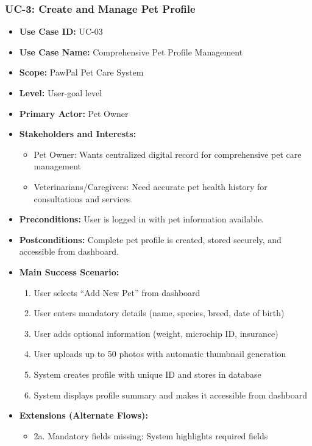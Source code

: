 \subsubsection*{UC-3: Create and Manage Pet Profile}
\begin{itemize}
    \item \textbf{Use Case ID:} UC-03
    \item \textbf{Use Case Name:} Comprehensive Pet Profile Management
    \item \textbf{Scope:} PawPal Pet Care System
    \item \textbf{Level:} User-goal level
    \item \textbf{Primary Actor:} Pet Owner
    \item \textbf{Stakeholders and Interests:}
    \begin{itemize}
        \item Pet Owner: Wants centralized digital record for comprehensive pet care management
        \item Veterinarians/Caregivers: Need accurate pet health history for consultations and services
    \end{itemize}
    \item \textbf{Preconditions:} User is logged in with pet information available.
    \item \textbf{Postconditions:} Complete pet profile is created, stored securely, and accessible from dashboard.
    \item \textbf{Main Success Scenario:}
    \begin{enumerate}
        \item User selects ``Add New Pet'' from dashboard
        \item User enters mandatory details (name, species, breed, date of birth)
        \item User adds optional information (weight, microchip ID, insurance)
        \item User uploads up to 50 photos with automatic thumbnail generation
        \item System creates profile with unique ID and stores in database
        \item System displays profile summary and makes it accessible from dashboard
    \end{enumerate}
    \item \textbf{Extensions (Alternate Flows):}
    \begin{itemize}
        \item 2a. Mandatory fields missing: System highlights required fields

\end{itemize}
\end{itemize}
